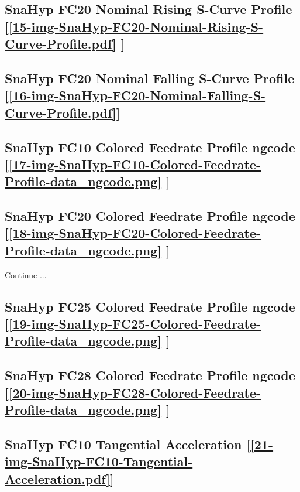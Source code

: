 \subsection     {SnaHyp FC20 Nominal Rising S-Curve Profile
	[\ref      {15-img-SnaHyp-FC20-Nominal-Rising-S-Curve-Profile.pdf} ] }
\label{ssec-15-img-SnaHyp-FC20-Nominal-Rising-S-Curve-Profile.pdf}

\subsection     {SnaHyp FC20 Nominal Falling S-Curve Profile
	[\ref      {16-img-SnaHyp-FC20-Nominal-Falling-S-Curve-Profile.pdf}] }
\label{ssec-16-img-SnaHyp-FC20-Nominal-Falling-S-Curve-Profile.pdf}

\subsection       {SnaHyp FC10 Colored Feedrate Profile ngcode
	[\ref      {17-img-SnaHyp-FC10-Colored-Feedrate-Profile-data_ngcode.png} ] }
\label{ssec-17-img-SnaHyp-FC10-Colored-Feedrate-Profile-data_ngcode.png}

\subsection       {SnaHyp FC20 Colored Feedrate Profile ngcode
	[\ref      {18-img-SnaHyp-FC20-Colored-Feedrate-Profile-data_ngcode.png} ] }
\label{ssec-18-img-SnaHyp-FC20-Colored-Feedrate-Profile-data_ngcode.png}

Continue ...\\

\subsection       {SnaHyp FC25 Colored Feedrate Profile ngcode
	[\ref      {19-img-SnaHyp-FC25-Colored-Feedrate-Profile-data_ngcode.png} ] }
\label{ssec-19-img-SnaHyp-FC25-Colored-Feedrate-Profile-data_ngcode.png}

\subsection       {SnaHyp FC28 Colored Feedrate Profile ngcode
	[\ref      {20-img-SnaHyp-FC28-Colored-Feedrate-Profile-data_ngcode.png} ] }
\label{ssec-20-img-SnaHyp-FC28-Colored-Feedrate-Profile-data_ngcode.png}

\subsection       {SnaHyp FC10 Tangential Acceleration
	[\ref      {21-img-SnaHyp-FC10-Tangential-Acceleration.pdf}] }
\label{ssec-21-img-SnaHyp-FC10-Tangential-Acceleration.pdf}

